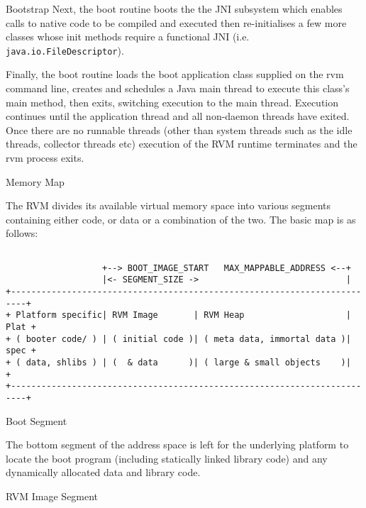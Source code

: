 \begin{section}{Bootstrap}
Next, the boot routine boots the the JNI subsystem which enables calls to native code to be compiled and executed then re-initialises a few more classes whose init methods require a functional JNI (i.e. \texttt{ja\-va.io.Fi\-le\-Des\-crip\-tor}).

Finally, the boot routine loads the boot application class supplied on the rvm command line, creates and schedules a Java main thread to execute this class's main method, then exits, switching execution to the main thread. Execution continues until the application thread and all non-daemon threads have exited. Once there are no runnable threads (other than system threads such as the idle threads, collector threads etc) execution of the RVM runtime terminates and the rvm process exits.

\begin{subsection}{Memory Map}

The RVM divides its available virtual memory space into various segments containing either code, or data or a combination of the two. The basic map is as follows:
\begin{lstlisting}[basicstyle=\scriptsize\ttfamily,frame=none] 

                   +--> BOOT_IMAGE_START   MAX_MAPPABLE_ADDRESS <--+
                   |<- SEGMENT_SIZE ->                             |
+-------------------------------------------------------------------------+
+ Platform specific| RVM Image       | RVM Heap                    | Plat +
+ ( booter code/ ) | ( initial code )| ( meta data, immortal data )| spec +
+ ( data, shlibs ) | (  & data      )| ( large & small objects    )|      +
+-------------------------------------------------------------------------+
\end{lstlisting}

\begin{subsubsection}{Boot Segment}

The bottom segment of the address space is left for the underlying platform to locate the boot program (including statically linked library code) and any dynamically allocated data and library code.

\end{subsubsection}

\begin{subsubsection}{RVM Image Segment}


\end{subsubsection}
\end{subsection}
\end{section}
